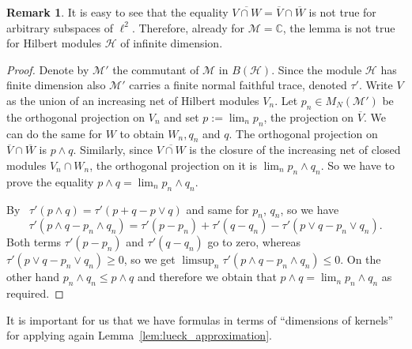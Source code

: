 \documentclass[10pt]{amsart}
\theoremstyle{definition}
\newtheorem{rema}[cdrthm]{Remark}
\newcommand{\Cmath}{\mathbb{C}}
\newcommand{\cM}{\mathcal{M}}
\newcommand{\cH}{\mathcal{H}}
\begin{document}
\begin{rema}
It is easy to see that the equality $\overline{V \cap W} = \overline{V} \cap \overline{W}$ is not true for arbitrary subspaces of $\ell^2$. Therefore, already for $\cM=\Cmath$, the lemma is not true for Hilbert modules $\cH$ of infinite dimension.
\end{rema}
\begin{proof}
Denote by $\cM'$ the commutant of $\cM$ in $B(\cH)$. Since the module $\cH$ has finite dimension also $\cM'$ carries a finite normal faithful trace, denoted $\tau'$. Write $V$ as the union of an increasing net of Hilbert modules $V_n$. Let $p_n \in M_N(\cM')$ be the orthogonal projection on $V_n$ and set $p:=\lim_n p_n$, the projection on $\overline{V}$. We can do the same for $W$ to obtain $W_n,q_n$ and $q$. The orthogonal projection on $\overline{V} \cap \overline{W}$ is $ p\wedge q$. Similarly, since $\overline{V \cap W}$ is the closure of the increasing net of closed modules $V_n \cap W_n$, the orthogonal projection on it is $\lim_n p_n \wedge q_n$. So we have to prove the equality $p \wedge q = \lim_n p_n \wedge q_n$.

By~\cite[Proposition~V.1.6]{takesakiVol1} $\tau'(p \wedge q) = \tau'(p+q-p\vee q)$ and same for $p_n$, $q_n$, so we have
\[
\tau'\left(p \wedge q - p_n \wedge q_n\right) = \tau'(p-p_n) +\tau'(q-q_n) - \tau'\left(p \vee q - p_n \vee q_n\right).
\]
Both terms $\tau'(p-p_n)$ and $\tau'(q-q_n)$ go to zero, whereas $\tau'(p \vee q - p_n \vee q_n) \geq 0$, so we get $\limsup_n \tau'(p \wedge q - p_n \wedge q_n)\leq 0$. On the other hand $p_n \wedge q_n \leq p \wedge q$ and therefore we obtain that $p \wedge q =\lim_n p_n \wedge q_n$ as required.
\end{proof}

It is important for us that we have formulas in terms of ``dimensions of kernels'' for applying again Lemma~\ref{lem:lueck_approximation}.
\end{document}
